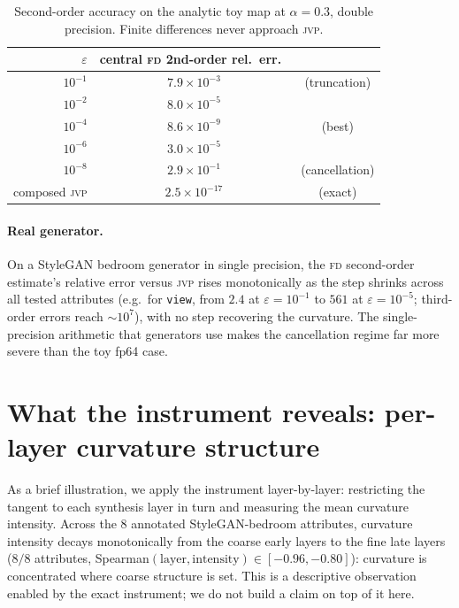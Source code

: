 \documentclass[11pt]{article}
\newcommand{\jvp}{\textsc{jvp}}
\newcommand{\fd}{\textsc{fd}}
\begin{document}
\begin{table}[h]\centering
\begin{tabular}{rcc}
\toprule
$\varepsilon$ & central \fd{} 2nd-order rel.\ err.\ & \\
\midrule
$10^{-1}$ & $7.9\times10^{-3}$ & (truncation) \\
$10^{-2}$ & $8.0\times10^{-5}$ & \\
$10^{-4}$ & $8.6\times10^{-9}$ & (best) \\
$10^{-6}$ & $3.0\times10^{-5}$ & \\
$10^{-8}$ & $2.9\times10^{-1}$ & (cancellation) \\
\midrule
composed \jvp & $2.5\times10^{-17}$ & (exact) \\
\bottomrule
\end{tabular}
\caption{Second-order accuracy on the analytic toy map at $\alpha=0.3$,
double precision. Finite differences never approach \jvp.}
\label{tab:toy}
\end{table}

\paragraph{Real generator.}
On a StyleGAN bedroom generator in single precision, the \fd{} second-order
estimate's relative error versus \jvp{} rises monotonically as the step shrinks
across all tested attributes (e.g.\ for \texttt{view}, from $2.4$ at
$\varepsilon=10^{-1}$ to $561$ at $\varepsilon=10^{-5}$; third-order errors reach
$\sim$$10^{7}$), with no step recovering the curvature. The single-precision
arithmetic that generators use makes the cancellation regime far more severe
than the toy fp64 case.

\section{What the instrument reveals: per-layer curvature structure}
As a brief illustration, we apply the instrument layer-by-layer: restricting the
tangent to each synthesis layer in turn and measuring the mean curvature
intensity. Across the $8$ annotated StyleGAN-bedroom attributes, curvature
intensity decays monotonically from the coarse early layers to the fine late
layers ($8/8$ attributes, Spearman$(\text{layer},\text{intensity})\in[-0.96,
-0.80]$): curvature is concentrated where coarse structure is set. This is a
descriptive observation enabled by the exact instrument; we do not build a claim
on top of it here.
\end{document}
